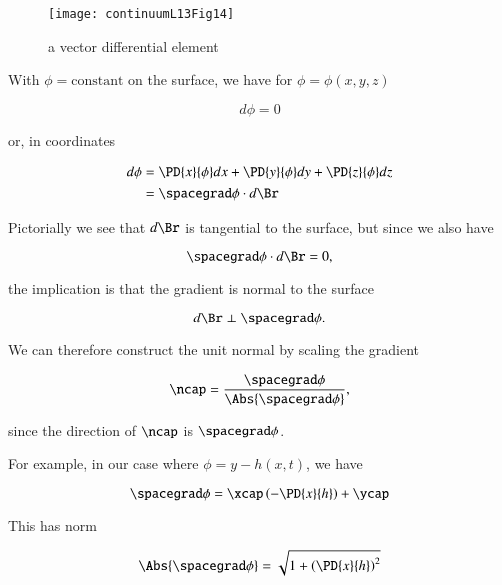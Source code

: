 \begin{figure}[htp]
   \centering
   \texttt{[image: continuumL13Fig14]}
   \caption{a vector differential element}\label{fig:continuumL13:continuumL13Fig14}
\end{figure}

With $\phi = \text{constant}$ on the surface, we have for $\phi = \phi(x, y, z)$

\begin{equation}\label{eqn:continuumL13:240}
d\phi = 0 
\end{equation}

or, in coordinates

\begin{align*}
d\phi &= 
\PD{x}{\phi} dx
+\PD{y}{\phi} dy
+\PD{z}{\phi} dz \\
&= \spacegrad \phi \cdot d\Br
\end{align*}

Pictorially we see that $d\Br$ is tangential to the surface, but since we also have

\begin{equation}\label{eqn:continuumL13:360}
\spacegrad \phi \cdot d\Br = 0,
\end{equation}

the implication is that the gradient is normal to the surface

\begin{equation}\label{eqn:continuumL13:380}
d\Br \perp \spacegrad \phi.
\end{equation}

We can therefore construct the unit normal by scaling the gradient

\begin{equation}\label{eqn:continuumL13:260}
\ncap = \frac{\spacegrad \phi}{\Abs{\spacegrad \phi}},
\end{equation}

since the direction of $\ncap$ is $\spacegrad \phi$.

For example, in our case where $\phi = y - h(x, t)$, we have

\begin{equation}\label{eqn:continuumL13:280}
\spacegrad \phi = \xcap \left( -\PD{x}{h} \right) + \ycap
\end{equation}

This has norm

\begin{equation}\label{eqn:continuumL13:300}
\Abs{\spacegrad \phi} = \sqrt{ 1 + \left( \PD{x}{h} \right)^2 }
\end{equation}

